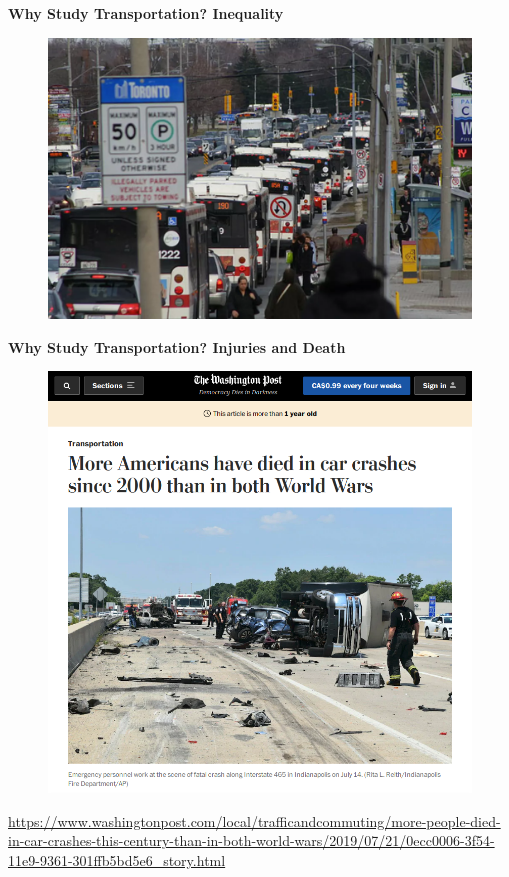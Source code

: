 \documentclass[aspectratio=169]{beamer}
\begin{document}


\begin{frame}
	\textbf{Why Study Transportation? Inequality}
	\begin{figure}
		\centering
		\includegraphics[width=0.8\linewidth]{images/ttc_traffic.png}
	\end{figure}
\end{frame}


\begin{frame}
	\textbf{Why Study Transportation? Injuries and Death}
	\begin{figure}
		\centering
		\includegraphics[width=0.5\linewidth]{images/wash_post_deaths.png}
	\end{figure}
	\tiny\url{https://www.washingtonpost.com/local/trafficandcommuting/more-people-died-in-car-crashes-this-century-than-in-both-world-wars/2019/07/21/0ecc0006-3f54-11e9-9361-301ffb5bd5e6_story.html}
\end{frame}
\end{document}
